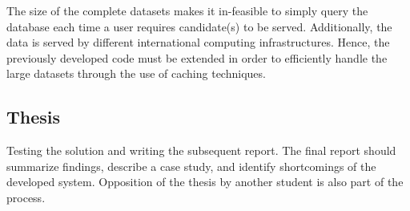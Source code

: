The size of the complete datasets makes it in-feasible to simply query the database each time a user requires candidate(s) to be served. Additionally, the data is served by different international computing infrastructures. Hence, the previously developed code must be extended in order to efficiently handle the large datasets through the use of caching techniques.

\subsection{Thesis}

Testing the solution and writing the subsequent report. The final report should summarize findings, describe a case study, and identify shortcomings of the developed system. Opposition of the thesis by another student is also part of the process.
